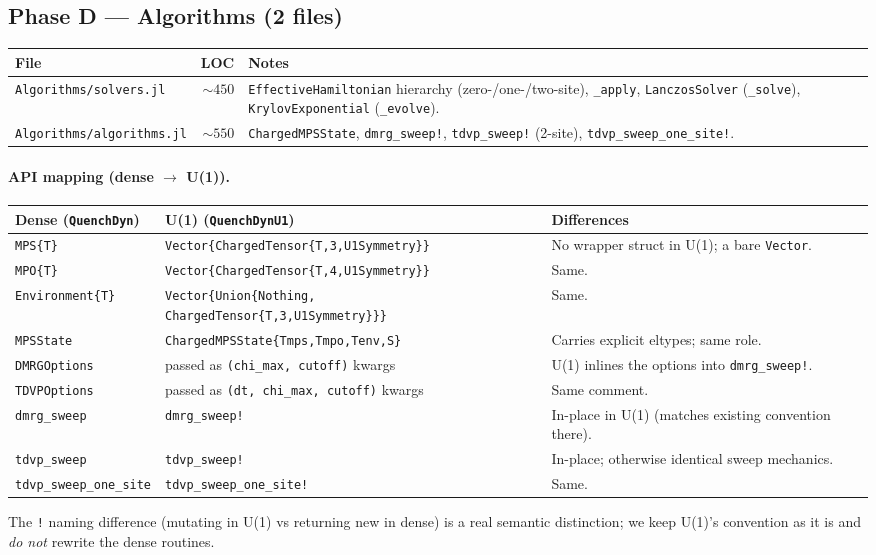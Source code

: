 \documentclass[11pt]{article}
\begin{document}
\subsection{Phase D --- Algorithms (2 files)}
\begin{center}
\begin{tabularx}{\linewidth}{l r X}
\toprule
File & LOC & Notes \\
\midrule
\texttt{Algorithms/solvers.jl}    & $\sim 450$ & \texttt{EffectiveHamiltonian} hierarchy (zero-/one-/two-site), \texttt{\_apply}, \texttt{LanczosSolver} (\texttt{\_solve}), \texttt{KrylovExponential} (\texttt{\_evolve}). \\
\texttt{Algorithms/algorithms.jl} & $\sim 550$ & \texttt{ChargedMPSState}, \texttt{dmrg\_sweep!}, \texttt{tdvp\_sweep!} (2-site), \texttt{tdvp\_sweep\_one\_site!}. \\
\bottomrule
\end{tabularx}
\end{center}

\paragraph{API mapping (dense $\to$ U(1)).}
\begin{center}
\begin{tabularx}{\linewidth}{l l X}
\toprule
Dense (\texttt{QuenchDyn}) & U(1) (\texttt{QuenchDynU1}) & Differences \\
\midrule
\texttt{MPS\{T\}}      & \texttt{Vector\{ChargedTensor\{T,3,U1Symmetry\}\}} & No wrapper struct in U(1); a bare \texttt{Vector}. \\
\texttt{MPO\{T\}}      & \texttt{Vector\{ChargedTensor\{T,4,U1Symmetry\}\}} & Same. \\
\texttt{Environment\{T\}} & \texttt{Vector\{Union\{Nothing, ChargedTensor\{T,3,U1Symmetry\}\}\}} & Same. \\
\texttt{MPSState}      & \texttt{ChargedMPSState\{Tmps,Tmpo,Tenv,S\}} & Carries explicit eltypes; same role. \\
\texttt{DMRGOptions}   & passed as \texttt{(chi\_max, cutoff)} kwargs & U(1) inlines the options into \texttt{dmrg\_sweep!}. \\
\texttt{TDVPOptions}   & passed as \texttt{(dt, chi\_max, cutoff)} kwargs & Same comment. \\
\texttt{dmrg\_sweep}   & \texttt{dmrg\_sweep!} & In-place in U(1) (matches existing convention there). \\
\texttt{tdvp\_sweep}   & \texttt{tdvp\_sweep!} & In-place; otherwise identical sweep mechanics. \\
\texttt{tdvp\_sweep\_one\_site} & \texttt{tdvp\_sweep\_one\_site!} & Same. \\
\bottomrule
\end{tabularx}
\end{center}
The \texttt{!} naming difference (mutating in U(1) vs returning new in dense)
is a real semantic distinction; we keep U(1)'s convention as it is and
\emph{do not} rewrite the dense routines.
\end{document}
